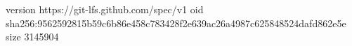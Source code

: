 version https://git-lfs.github.com/spec/v1
oid sha256:9562592815b59c6b86e458c783428f2e639ac26a4987c625848524dafd862e5e
size 3145904
